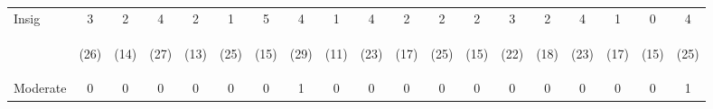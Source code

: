 \begin{tabular}{lcccccccccccccccccc}
\hline \noalign{\smallskip}Insig & 3 & 2 & 4 & 2 & 1 & 5 & 4 & 1 & 4 & 2 & 2 & 2 & 3 & 2 & 4 & 1 & 0 & 4\\
 & \begin{footnotesize}(26)\end{footnotesize} & \begin{footnotesize}(14)\end{footnotesize} & \begin{footnotesize}(27)\end{footnotesize} & \begin{footnotesize}(13)\end{footnotesize} & \begin{footnotesize}(25)\end{footnotesize} & \begin{footnotesize}(15)\end{footnotesize} & \begin{footnotesize}(29)\end{footnotesize} & \begin{footnotesize}(11)\end{footnotesize} & \begin{footnotesize}(23)\end{footnotesize} & \begin{footnotesize}(17)\end{footnotesize} & \begin{footnotesize}(25)\end{footnotesize} & \begin{footnotesize}(15)\end{footnotesize} & \begin{footnotesize}(22)\end{footnotesize} & \begin{footnotesize}(18)\end{footnotesize} & \begin{footnotesize}(23)\end{footnotesize} & \begin{footnotesize}(17)\end{footnotesize} & \begin{footnotesize}(15)\end{footnotesize} & \begin{footnotesize}(25)\end{footnotesize}\\
\noalign{\smallskip}Moderate & 0 & 0 & 0 & 0 & 0 & 0 & 1 & 0 & 0 & 0 & 0 & 0 & 0 & 0 & 0 & 0 & 0 & 1\\

\end{tabular}
